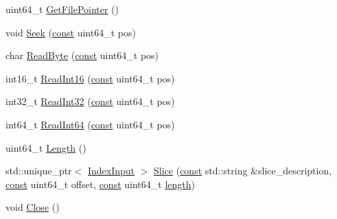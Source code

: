 \begin{DoxyCompactItemize}
\item 
uint64\+\_\+t \mbox{\hyperlink{classlucene_1_1core_1_1store_1_1ByteBufferIndexInput_a820ded57153788dfb338c332ec62b499}{Get\+File\+Pointer}} ()
\item 
void \mbox{\hyperlink{classlucene_1_1core_1_1store_1_1ByteBufferIndexInput_a738aaa390f9fe7c48006969b857bcc62}{Seek}} (\mbox{\hyperlink{ZlibCrc32_8h_a2c212835823e3c54a8ab6d95c652660e}{const}} uint64\+\_\+t pos)
\item 
char \mbox{\hyperlink{classlucene_1_1core_1_1store_1_1ByteBufferIndexInput_a0fb241ca8931bee606adc3673278c020}{Read\+Byte}} (\mbox{\hyperlink{ZlibCrc32_8h_a2c212835823e3c54a8ab6d95c652660e}{const}} uint64\+\_\+t pos)
\item 
int16\+\_\+t \mbox{\hyperlink{classlucene_1_1core_1_1store_1_1ByteBufferIndexInput_a8fdaba5ee8b09349dfb85413ec683dad}{Read\+Int16}} (\mbox{\hyperlink{ZlibCrc32_8h_a2c212835823e3c54a8ab6d95c652660e}{const}} uint64\+\_\+t pos)
\item 
int32\+\_\+t \mbox{\hyperlink{classlucene_1_1core_1_1store_1_1ByteBufferIndexInput_a4d633d98060b140f8e416c3178ae842f}{Read\+Int32}} (\mbox{\hyperlink{ZlibCrc32_8h_a2c212835823e3c54a8ab6d95c652660e}{const}} uint64\+\_\+t pos)
\item 
int64\+\_\+t \mbox{\hyperlink{classlucene_1_1core_1_1store_1_1ByteBufferIndexInput_a7d3a10f0f6a68cc86d6737d457d4d45f}{Read\+Int64}} (\mbox{\hyperlink{ZlibCrc32_8h_a2c212835823e3c54a8ab6d95c652660e}{const}} uint64\+\_\+t pos)
\item 
uint64\+\_\+t \mbox{\hyperlink{classlucene_1_1core_1_1store_1_1ByteBufferIndexInput_aa82bcd80c3bd0eb18d9bd5533992e146}{Length}} ()
\item 
std\+::unique\+\_\+ptr$<$ \mbox{\hyperlink{classlucene_1_1core_1_1store_1_1IndexInput}{Index\+Input}} $>$ \mbox{\hyperlink{classlucene_1_1core_1_1store_1_1ByteBufferIndexInput_acadb7814d29b518a2b165aa29184a9ab}{Slice}} (\mbox{\hyperlink{ZlibCrc32_8h_a2c212835823e3c54a8ab6d95c652660e}{const}} std\+::string \&slice\+\_\+description, \mbox{\hyperlink{ZlibCrc32_8h_a2c212835823e3c54a8ab6d95c652660e}{const}} uint64\+\_\+t offset, \mbox{\hyperlink{ZlibCrc32_8h_a2c212835823e3c54a8ab6d95c652660e}{const}} uint64\+\_\+t \mbox{\hyperlink{classlucene_1_1core_1_1store_1_1ByteBufferIndexInput_acc7f63d7cbe6fe5047d6f2ef2d3f28bf}{length}})
\item 
void \mbox{\hyperlink{classlucene_1_1core_1_1store_1_1ByteBufferIndexInput_af02f6df059efa32b8d60cec43723d488}{Close}} ()
\end{DoxyCompactItemize}
